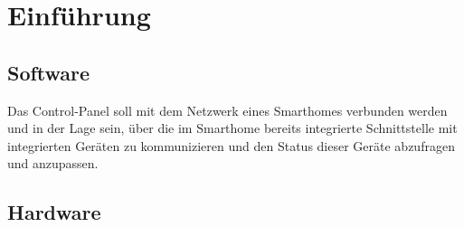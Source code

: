\chapter{Einführung}
    \section{Software}
        Das Control-Panel soll mit dem Netzwerk eines Smarthomes
        verbunden werden und in der Lage sein, über die im Smarthome 
        bereits integrierte Schnittstelle mit integrierten Geräten zu 
        kommunizieren und den Status dieser Geräte abzufragen und anzupassen.


    \section{Hardware}
        
        
        
